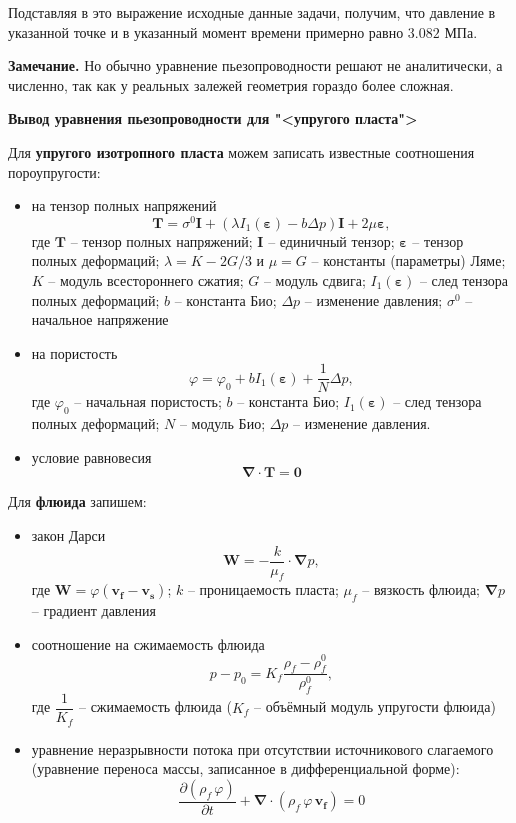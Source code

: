 \documentclass[a4paper,14pt]{extarticle}
\newcommand{\beq}{\begin{equation}}
\newcommand{\eeq}{\end{equation}}
\begin{document}
Подставляя в это выражение исходные данные задачи, получим, что давление в указанной точке и в указанный момент времени примерно равно $3.082\text{ МПа}$.

\textbf{Замечание.} Но обычно уравнение пьезопроводности решают не аналитически, а численно, так как у реальных залежей геометрия гораздо более сложная.

\newpage

\textbf{Вывод уравнения пьезопроводности для "<упругого пласта">}

Для \textbf{упругого изотропного пласта} можем записать известные соотношения пороупругости:
\begin{itemize}[parsep=-1pt]
\item на тензор полных напряжений \\
\beq
\pmb{T}=\sigma^0\pmb{I}+\left(\lambda I_1(\pmb{\varepsilon})-b\Delta p\right)\pmb{I}+2\mu\pmb{\varepsilon},
\eeq
где $\pmb{T}$ -- тензор полных напряжений; $\pmb{I}$ -- единичный тензор; $\pmb{\varepsilon}$ -- тензор полных деформаций; $\lambda=K-2G/3$ и $\mu=G$ -- константы (параметры) Ляме; $K$ -- модуль всестороннего сжатия; $G$ -- модуль сдвига; $I_1(\pmb{\varepsilon})$ -- след тензора полных деформаций; $b$ -- константа Био; $\Delta p$ -- изменение давления; $\sigma^0$ -- начальное напряжение
\item на пористость \\
\beq
\varphi = \varphi_0+bI_1(\pmb{\varepsilon})+\dfrac{1}{N}\Delta p,
\eeq
где $\varphi_0$ -- начальная пористость; $b$ -- константа Био; $I_1(\pmb{\varepsilon})$ -- след тензора полных деформаций; $N$ -- модуль Био; $\Delta p$ -- изменение давления.
\item условие равновесия \\
\beq
\pmb{\nabla}\cdot\pmb{T}=\pmb{0}
\eeq
\end{itemize}

Для \textbf{флюида} запишем:
\begin{itemize}[parsep=-1pt]
	\item закон Дарси \\
	\beq
	\pmb{W}=-\frac{k}{\mu_f}\cdot\pmb{\nabla} p,
	\eeq
	где $\pmb{W}=\varphi\left(\pmb{v_{\!f}}-\pmb{v_{\!s}}\right)$; $k$ -- проницаемость пласта; $\mu_{\!f}$ -- вязкость флюида; $\pmb{\nabla} p$ -- градиент давления
	\item соотношение на сжимаемость флюида
	\beq
	p-p_0=K_{\!f}\frac{\rho_{\!f}-\rho_{\!f}^0}{\rho_{\!f}^0},
	\eeq
	где $\dfrac{1}{K_{\!f}}$ -- сжимаемость флюида ($K_{\!f}$ -- объёмный модуль упругости флюида)
	\item уравнение неразрывности потока при отсутствии источникового слагаемого (уравнение переноса массы, записанное в дифференциальной форме):
	\beq
	\frac{\partial\left(\rho_{\!f}\,\varphi\right)}{\partial t}+\pmb{\nabla}\cdot\left(\rho_{\!f}\,\varphi\,\pmb{v_{\!f}}\right)=0
	\eeq
\end{itemize}
\end{document}
